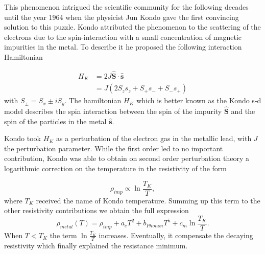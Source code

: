 This phenomenon intrigued the scientific community for the following decades until the year 1964 when the physicist  Jun Kondo gave the first convincing solution to this puzzle. Kondo attributed the phenomenon to the scattering of the electrons due to the spin-interaction with a small concentration of magnetic impurities in the metal. To describe it he proposed the following interaction Hamiltonian


\begin{align}
H_K &= 2J\hat{\textbf{S}}\cdot \hat{\textbf{s}} \\
&=  J (2S_z s_z + S_+s_- +S_-s_+)
\end{align}
with $S_\pm = S_x \pm iS_y$. The hamiltonian $H_K$ which is better known as the Kondo s-d model describes the spin interaction between the spin of the impurity $\hat{\textbf{S}}$ and the spin of the particles in the metal $\hat{\textbf{s}}$.


Kondo took $H_K$ as a perturbation of the electron gas in the metallic lead, with $J$ the perturbation parameter. While the first order led to no important contribution, Kondo was able to obtain on second order perturbation theory a logarithmic correction on the temperature in the resistivity of the form 

\begin{equation}
\rho_{imp} \propto \ln{\frac {
T_K }{T}},
\end{equation}
where $T_K$ received the name of Kondo temperature. Summing up this term to the other resistivity contributions we obtain the full expression 
\begin{equation}
{\displaystyle \rho_{metal} (T)=\rho_{imp}+a_{e}T^{2}+b_{Phonon}T^{5} + c_{m}\ln {\frac {
T_K }{T}}}.
\label{logKondo}
\end{equation}
\noindent When $T< T_K$ the term $ \ln {\frac {
T_K }{T}}$ increases. Eventually, it compensate the decaying resistivity which finally explained the  resistance minimum. 

